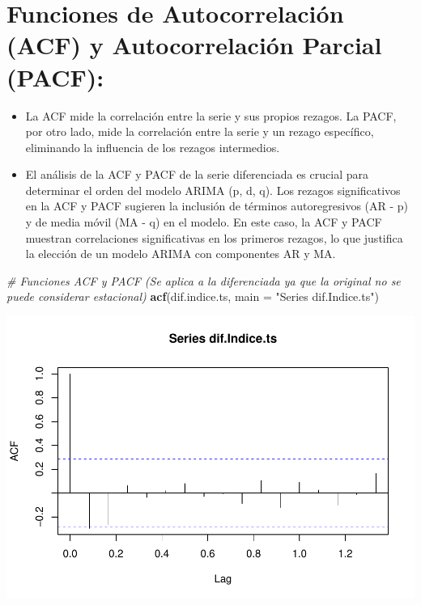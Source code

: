 \documentclass[
]{book}
\newenvironment{Shaded}{\begin{snugshade}}{\end{snugshade}}
\newcommand{\AttributeTok}[1]{\textcolor[rgb]{0.13,0.29,0.53}{#1}}
\newcommand{\CommentTok}[1]{\textcolor[rgb]{0.56,0.35,0.01}{\textit{#1}}}
\newcommand{\FunctionTok}[1]{\textcolor[rgb]{0.13,0.29,0.53}{\textbf{#1}}}
\newcommand{\NormalTok}[1]{#1}
\newcommand{\StringTok}[1]{\textcolor[rgb]{0.31,0.60,0.02}{#1}}
\begin{document}
\section{Funciones de Autocorrelación (ACF) y Autocorrelación Parcial (PACF):}\label{funciones-de-autocorrelaciuxf3n-acf-y-autocorrelaciuxf3n-parcial-pacf}

\begin{itemize}
\item
  La ACF mide la correlación entre la serie y sus propios rezagos. La PACF, por otro lado, mide la correlación entre la serie y un rezago específico, eliminando la influencia de los rezagos intermedios.
\item
  El análisis de la ACF y PACF de la serie diferenciada es crucial para determinar el orden del modelo ARIMA (p, d, q). Los rezagos significativos en la ACF y PACF sugieren la inclusión de términos autoregresivos (AR - p) y de media móvil (MA - q) en el modelo. En este caso, la ACF y PACF muestran correlaciones significativas en los primeros rezagos, lo que justifica la elección de un modelo ARIMA con componentes AR y MA.
\end{itemize}

\begin{Shaded}
\begin{Highlighting}[]
\CommentTok{\# Funciones ACF y PACF (Se aplica a la diferenciada ya que la original no se puede considerar estacional)}
\FunctionTok{acf}\NormalTok{(dif.indice.ts, }\AttributeTok{main =} \StringTok{"Series dif.Indice.ts"}\NormalTok{)}
\end{Highlighting}
\end{Shaded}

\includegraphics{_main_files/figure-latex/unnamed-chunk-16-1.pdf}
\end{document}
